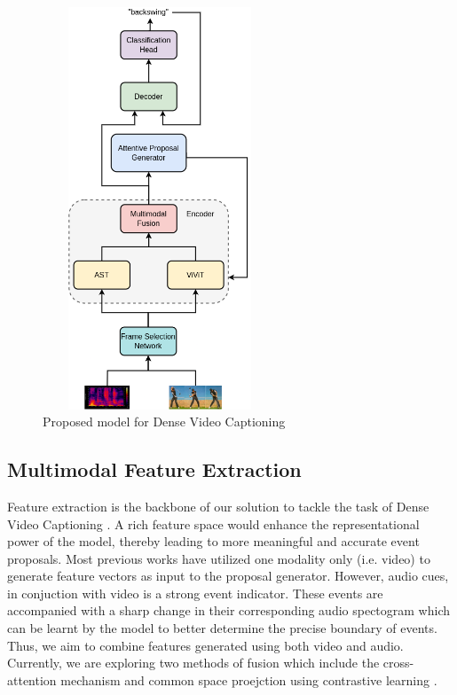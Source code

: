 \begin{figure} [H]
	\centering
	\includegraphics[width=7cm, height=12cm] {assets/img/dvc_arch.png}
	\caption{Proposed model for Dense Video Captioning}
\end{figure}

\subsection{Multimodal Feature Extraction}
\par Feature extraction is the backbone of our solution to tackle the task of Dense Video Captioning \cite{krishna2017densecaptioning}. A rich feature space would enhance the representational power of the model, thereby leading to more meaningful and accurate event proposals. Most previous works have utilized one modality only (i.e. video) to generate feature vectors as input to the proposal generator. However, audio cues, in conjuction with video is a strong event indicator. These events are accompanied with a sharp change in their corresponding audio spectogram which can be learnt by the model to better determine the precise boundary of events. Thus, we aim to combine features generated using both video and audio. Currently, we are exploring two methods of fusion which include the cross-attention mechanism \cite{iashin2020better} and common space proejction using contrastive learning \cite{vatt}.


